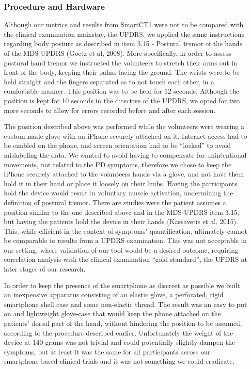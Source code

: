 \subsubsection{Procedure and Hardware}
\label{subsubsec:smartCT1ProcHardware}

Although our metrics and results from \gls{SmartCT1} were not to be compared with the clinical examination mainstay, the \gls{UPDRS}, we applied the same instructions regarding body posture as described in item 3.15 - Postural tremor of the hands of the \gls{MDS}-\gls{UPDRS} (Goetz et al, 2008). More specifically, in order to assess postural hand tremor we instructed the volunteers to stretch their arms out in front of the body, keeping their palms facing the ground. The wrists were to be held straight and the fingers separated as to not touch each other, in a comfortable manner. This position was to be held for 12 seconds. Although the position is kept for 10 seconds in the directive of the \gls{UPDRS}, we opted for two more seconds to allow for errors recorded before and after each session. 

The position described above was performed while the volunteers were wearing a custom-made glove with an iPhone securely attached on it. Internet access had to be enabled on the phone, and screen orientation had to be ``locked'' to avoid mislabeling the data. We wanted to avoid having to compensate for unintentional movements, not related to the \gls{PD} symptoms, therefore we chose to keep the iPhone securely attached to the volunteers hands via a glove, and not have them hold it in their hand or place it loosely on their limbs. Having the participants hold the device would result in voluntary muscle activation, undermining the definition of postural tremor. There are studies were the patient assumes a position similar to the one described above and in the \gls{MDS}-\gls{UPDRS} item 3.15, but having the patients hold the device in their hands (Kassavetis et al, 2015). This, while efficient in the context of symptoms' quantification, ultimately cannot be comparable to results from a \gls{UPDRS} examination. This was not acceptable in our setting, where validation of our tool would be a desired outcome, requiring correlation analysis with the clinical examination ``gold standard'', the \gls{UPDRS} at later stages of our research. 

In order to keep the presence of the smartphone as discreet as possible we built an inexpensive apparatus consisting of an elastic glove, a perforated, rigid smartphone shell case and some non-elastic thread. The result was an easy to put on and lightweight glove-case that would keep the phone attached on the patients' dorsal part of the hand, without hindering the position to be assumed, according to the procedure described earlier. Unfortunately the weight of the device at 140 grams was not trivial and could potentially slightly dampen the symptoms, but at least it was the same for all participants across our smartphone-based clinical trials and it was not something we could eradicate. 

